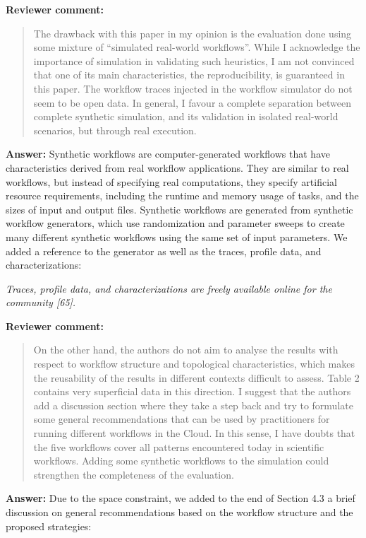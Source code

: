 \documentclass{letter}
\newenvironment{review}%
{\textbf{Reviewer comment:}\begin{quote}}%
{\end{quote}}%
\newcommand{\answer}[1]{%
      \textbf{Answer:} #1}
\newcommand{\revised}[1]{\emph{#1}\color{black}}
\begin{document}
\begin{letter}{}
\begin{review}
The drawback with this paper in my opinion is the evaluation done using some mixture of ``simulated real-world workflows''. While I acknowledge the importance of simulation in validating such heuristics, I am not convinced that one of its main characteristics, the reproducibility, is guaranteed in this paper. The workflow traces injected in the workflow simulator do not seem to be open data. In general, I favour a complete separation between complete synthetic simulation, and its validation in isolated real-world scenarios, but through real execution. 
\end{review}

\answer{Synthetic workflows are computer-generated workflows that have characteristics derived from real workflow applications. They are similar to real workflows, but instead of specifying real computations, they specify artificial resource requirements, including the runtime and memory usage of tasks, and the sizes of input and output files. Synthetic workflows are generated from synthetic workflow generators, which use randomization and parameter sweeps to create many different synthetic workflows using the same set of input parameters. We added a reference to the generator as well as the traces, profile data, and characterizations:}

\revised{Traces, profile data, and characterizations are freely available online for the community [65]. }



\begin{review}
On the other hand, the authors do not aim to analyse the results with respect to workflow structure and topological characteristics, which makes the reusability of the results in different contexts difficult to assess. Table 2 contains very superficial data in this direction. I suggest that the authors add a discussion section where they take a step back and try to formulate some general recommendations that can be used by practitioners for running different workflows in the Cloud. In this sense, I have doubts that the five workflows cover all patterns encountered today in scientific workflows. Adding some synthetic workflows to the simulation could strengthen the completeness of the evaluation.
\end{review}

\answer{Due to the space constraint, we added to the end of Section 4.3 a brief discussion on general recommendations based on the workflow structure and the proposed strategies:}


\end{letter}
\end{document}
